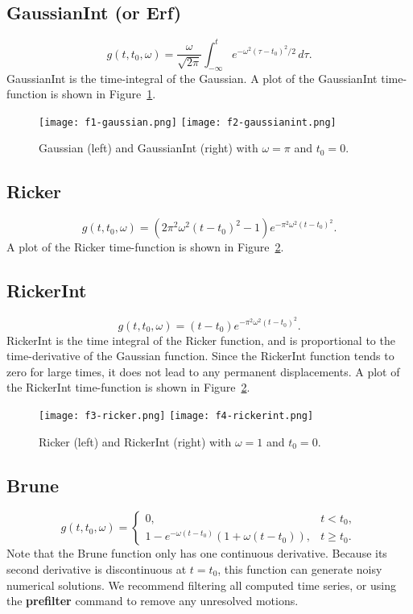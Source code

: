 \documentclass[11pt]{report}
\begin{document}
\subsection{GaussianInt (or Erf)}\label{gaussianint}
\[
g(t,t_0,\omega) = \dfrac{\omega}{\sqrt{2 \pi}} \int_{-\infty}^t e^{-\omega^2 (\tau - t_0)^2/2}\,d\tau.
\] 
GaussianInt is the time-integral of the Gaussian. A plot of the
GaussianInt time-function is shown in Figure~\ref{fig:gaussians}.
\begin{figure}
\begin{centering}
  \texttt{[image: f1-gaussian.png]}
  \texttt{[image: f2-gaussianint.png]}
  \caption{Gaussian (left) and GaussianInt (right) with $\omega=\pi$ and $t_0=0$.}
  \label{fig:gaussians}
\end{centering}
\end{figure}  
%
\subsection{Ricker} \label{ricker}
  \[
  g(t,t_0,\omega) = \left(2 \pi^2 \omega^2 (t - t_0)^2 - 1\right) e^{- \pi^2 \omega^2 (t - t_0)^2}.
  \]
A plot of the Ricker time-function is shown in Figure~\ref{fig:rickers}.
\subsection{RickerInt}\label{rickerint}
  \[
  g(t,t_0,\omega) = (t - t_0) e^{- \pi^2 \omega^2 (t - t_0)^2}.
  \]
RickerInt is the time integral of the Ricker function, and is proportional to the time-derivative of
the Gaussian function. Since the RickerInt function tends to zero for large times, it does not lead
to any permanent displacements. A plot of the RickerInt time-function is shown in
Figure~\ref{fig:rickers}.
\begin{figure}
\begin{centering}
  \texttt{[image: f3-ricker.png]}
  \texttt{[image: f4-rickerint.png]}
  \caption{Ricker (left) and RickerInt (right) with $\omega=1$ and $t_0=0$.}
  \label{fig:rickers}
\end{centering}
\end{figure}  
%
\subsection{Brune} 
 \label{brune}
\[
 g(t,t_0,\omega) = \left\{
\begin{array}{ll} 
0, & t < t_0, \\ 
1 - e^{-\omega(t-t_0)}( 1+\omega(t-t_0) ), & t \geq t_0.
\end{array}
\right.
\]
Note that the Brune function only has one continuous derivative. Because its second derivative is discontinuous at
$t=t_0$, this function can generate noisy numerical solutions. We recommend filtering all computed time
series, or using the {\bf prefilter} command to remove any unresolved motions.
\end{document}
